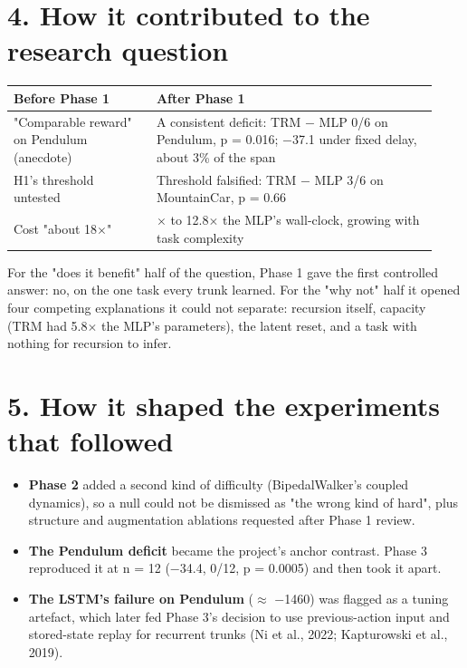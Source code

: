 \documentclass[11pt]{article}
\begin{document}
\section*{4. How it contributed to the research question}



\begin{center}\small\begin{tabular}{>{\raggedright\arraybackslash}p{0.319\linewidth}>{\raggedright\arraybackslash}p{0.615\linewidth}}
\toprule
Before Phase 1 & After Phase 1 \\
\midrule
"Comparable reward" on Pendulum (anecdote) & A consistent deficit: TRM $-$ MLP 0/6 on Pendulum, p = 0.016; $-$37.1 under fixed delay, about 3\% of the span \\
H1's threshold untested & Threshold falsified: TRM $-$ MLP 3/6 on MountainCar, p = 0.66 \\
Cost "about 18$\times$" & 6.7$\times$ to 12.8$\times$ the MLP's wall-clock, growing with task complexity \\
\bottomrule
\end{tabular}\end{center}



For the "does it benefit" half of the question, Phase 1 gave the first controlled answer: no, on the one task every trunk learned. For the "why not" half it opened four competing explanations it could not separate: recursion itself, capacity (TRM had 5.8$\times$ the MLP's parameters), the latent reset, and a task with nothing for recursion to infer.



\section*{5. How it shaped the experiments that followed}



\begin{itemize}
\item \textbf{Phase 2} added a second kind of difficulty (BipedalWalker's coupled dynamics), so a null could not be dismissed as "the wrong kind of hard", plus structure and augmentation ablations requested after Phase 1 review.
\item \textbf{The Pendulum deficit} became the project's anchor contrast. Phase 3 reproduced it at n = 12 ($-$34.4, 0/12, p = 0.0005) and then took it apart.
\item \textbf{The LSTM's failure on Pendulum} ($\approx$ $-$1460) was flagged as a tuning artefact, which later fed Phase 3's decision to use previous-action input and stored-state replay for recurrent trunks (Ni et al., 2022; Kapturowski et al., 2019).
\end{itemize}
\end{document}
